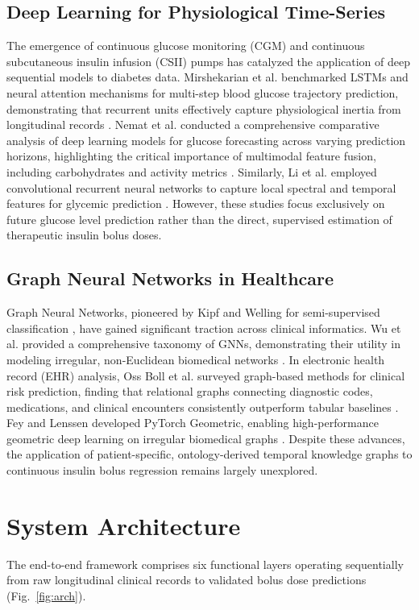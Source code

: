 \documentclass[10pt,a4paper]{article}
\begin{document}
\subsection{Deep Learning for Physiological Time-Series}
The emergence of continuous glucose monitoring (CGM) and continuous subcutaneous insulin infusion (CSII) pumps has catalyzed the application of deep sequential models to diabetes data. Mirshekarian et al. benchmarked LSTMs and neural attention mechanisms for multi-step blood glucose trajectory prediction, demonstrating that recurrent units effectively capture physiological inertia from longitudinal records \cite{mirshekarian2019}. Nemat et al. conducted a comprehensive comparative analysis of deep learning models for glucose forecasting across varying prediction horizons, highlighting the critical importance of multimodal feature fusion, including carbohydrates and activity metrics \cite{nemat2024}. Similarly, Li et al. employed convolutional recurrent neural networks to capture local spectral and temporal features for glycemic prediction \cite{li2020}. However, these studies focus exclusively on future glucose level prediction rather than the direct, supervised estimation of therapeutic insulin bolus doses.

\subsection{Graph Neural Networks in Healthcare}
Graph Neural Networks, pioneered by Kipf and Welling for semi-supervised classification \cite{kipf2017}, have gained significant traction across clinical informatics. Wu et al. provided a comprehensive taxonomy of GNNs, demonstrating their utility in modeling irregular, non-Euclidean biomedical networks \cite{wu2021}. In electronic health record (EHR) analysis, Oss Boll et al. surveyed graph-based methods for clinical risk prediction, finding that relational graphs connecting diagnostic codes, medications, and clinical encounters consistently outperform tabular baselines \cite{ossboll2024}. Fey and Lenssen developed PyTorch Geometric, enabling high-performance geometric deep learning on irregular biomedical graphs \cite{fey2019}. Despite these advances, the application of patient-specific, ontology-derived temporal knowledge graphs to continuous insulin bolus regression remains largely unexplored.

\section{System Architecture}
The end-to-end framework comprises six functional layers operating sequentially from raw longitudinal clinical records to validated bolus dose predictions (Fig.~\ref{fig:arch}).
\end{document}
